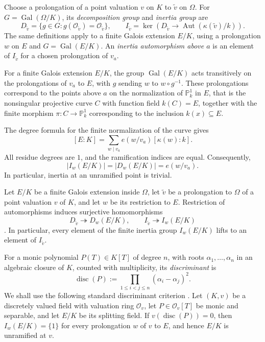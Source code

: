 \documentclass[10pt,a4paper]{amsart}
\renewcommand{\leq}{\leqslant}
\theoremstyle{definition}
\DeclareMathOperator{\Gal}{Gal}
\DeclareMathOperator{\Aut}{Aut}
\begin{document}
Choose a prolongation of a point valuation $v$ on $K$ to $\widetilde v$ on $\Omega$.
For $G=\Gal(\Omega/K)$, its \emph{decomposition group} and
\emph{inertia group} are
\[
D_{\widetilde v}
=\{g\in G:g(\mathcal O_{\widetilde v})
                         =\mathcal O_{\widetilde v}\},\qquad
I_{\widetilde v}
=\ker\!\left(D_{\widetilde v}\to
               \Aut(\kappa(\widetilde v)/k)\right).
\]
The same definitions apply to a finite Galois extension $E/K$,
using a prolongation $w$ on $E$ and $G=\Gal(E/K)$.
An \emph{inertia automorphism above $a$} is an element of
$I_{\widetilde v}$ for a chosen prolongation of $v_a$.

For a finite Galois extension $E/K$, the group $\Gal(E/K)$
acts transitively on the prolongations of $v_a$ to $E$,
with $g$ sending $w$ to $w\circ g^{-1}$.
These prolongations correspond to the points above $a$
on the normalization of $\mathbb P^1_k$ in $E$, that is the
nonsingular projective curve $C$ with function field $k(C)=E$,
together with the finite morphism $\pi:C\longrightarrow\mathbb P^1_k$
corresponding to the inclusion $k(x)\subseteq E$.

The degree formula for the finite normalization
of the curve gives
\[
[E:K]=\sum_{w\mid v_a}e(w/v_a)[\kappa(w):k].
\]
All residue degrees are $1$, and the ramification indices are equal.
Consequently,
\[
|I_w(E/K)|=|D_w(E/K)|=e(w/v_a).
\]
In particular, inertia at an unramified point is trivial.

Let $E/K$ be a finite Galois extension inside $\Omega$,
let $\widetilde v$ be a prolongation to $\Omega$ of a point
valuation $v$ of $K$, and let $w$ be its restriction to $E$.
Restriction of automorphisms induces surjective homomorphisms
\[
D_{\widetilde v}\twoheadrightarrow D_w(E/K),
\qquad
I_{\widetilde v}\twoheadrightarrow I_w(E/K)
\]
\cite[Tag~0BSX]{Stacks}.
In particular, every element of the finite inertia group
$I_w(E/K)$ lifts to an element of $I_{\widetilde v}$.

For a monic polynomial $P(T)\in K[T]$ of degree $n$, with roots
$\alpha_1,\ldots,\alpha_n$ in an algebraic closure of $K$, counted
with multiplicity, its \emph{discriminant} is
\[
\operatorname{disc}(P)
:=\prod_{1\leq i<j\leq n}(\alpha_i-\alpha_j)^2.
\]
We shall use the following standard discriminant criterion
\cite[Tags~0BJF, 0EXR, and~0BTF]{Stacks}.
Let $(K,v)$ be a discretely valued field with valuation ring
$\mathcal O_v$, let $P\in\mathcal O_v[T]$ be monic and separable,
and let $E/K$ be its splitting field.
If $v(\operatorname{disc}(P))=0$, then
$I_w(E/K)=\{1\}$ for every prolongation $w$ of $v$ to $E$,
and hence $E/K$ is unramified at $v$.
\end{document}
